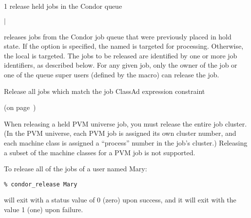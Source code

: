 \begin{ManPage}{\label{man-condor-release}}{1}
{release held jobs in the Condor queue}
\Synopsis {}
\ToolArgsBase 

\ToolDebugOption
\ToolLocate
\ToolJobs
$|$  \Dots

\ToolDebugOption
\ToolLocate
\ToolAll


\Description

 releases jobs from the Condor job queue that were 
previously placed in hold state.  
If the  option is specified, the named  is targeted
for processing.  
Otherwise, the local  is targeted.
The jobs to be released are identified by one or more job identifiers, as
described below.
For any given job, only the owner of the job or one of the queue super users
(defined by the  macro) can release the job.

\begin{Options}
	\ToolArgsBaseDesc
	\ToolLocateDesc
	\ToolDebugDesc
	 {Release all jobs which match
	                the job ClassAd expression constraint}
\end{Options}

\SeeAlso
{} (on page~\pageref{man-condor-hold})

\GenRem

When releasing a held PVM universe job, you must release the entire
job cluster.  (In the PVM universe, each PVM job is assigned its own
cluster number, and each machine class is assigned a ``process''
number in the job's cluster.)  Releasing a subset of the machine
classes for a PVM job is not supported.

\Examples
To release all of the jobs of a user named Mary:
\footnotesize
\begin{verbatim}
% condor_release Mary 
\end{verbatim}
\normalsize

\ExitStatus

 will exit with a status value of 0 (zero) upon success,
and it will exit with the value 1 (one) upon failure.

\end{ManPage}
